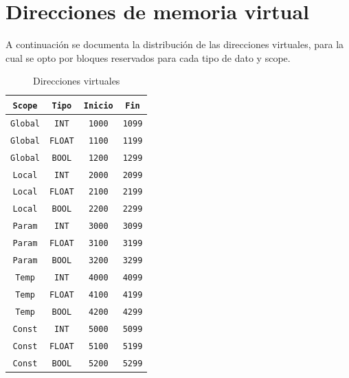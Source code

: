 \documentclass[12pt, letterpaper]{article}
\theoremstyle{definition}
\begin{document}
\section{Direcciones de memoria virtual}
A continuación se documenta la distribución de las direcciones virtuales, para la cual se opto por bloques reservados para cada tipo de dato y scope.
\begin{table}[H]
\centering
\caption{Direcciones virtuales}
\label{tab:cubo}
\begin{tabular}{|c|c|c|c|}
    \hline
    \texttt{Scope} & \texttt{Tipo} & \texttt{Inicio} & \texttt{Fin} \\
    \hline
    \texttt{Global}   & \texttt{INT}   & \texttt{1000} & \texttt{1099}   \\ \hline
    \texttt{Global}   & \texttt{FLOAT} & \texttt{1100} & \texttt{1199}   \\ \hline
    \texttt{Global}   & \texttt{BOOL} & \texttt{1200} & \texttt{1299}   \\ \hline
    \texttt{Local}   & \texttt{INT}   & \texttt{2000} & \texttt{2099}   \\ \hline
    \texttt{Local}   & \texttt{FLOAT} & \texttt{2100} & \texttt{2199}   \\ \hline
    \texttt{Local}   & \texttt{BOOL} & \texttt{2200} & \texttt{2299}   \\ \hline
    \texttt{Param}   & \texttt{INT}   & \texttt{3000} & \texttt{3099}   \\ \hline
    \texttt{Param}   & \texttt{FLOAT} & \texttt{3100} & \texttt{3199}   \\ \hline
    \texttt{Param}   & \texttt{BOOL} & \texttt{3200} & \texttt{3299}   \\ \hline
    \texttt{Temp}   & \texttt{INT}   & \texttt{4000} & \texttt{4099}   \\ \hline
    \texttt{Temp}   & \texttt{FLOAT} & \texttt{4100} & \texttt{4199}   \\ \hline
    \texttt{Temp}   & \texttt{BOOL} & \texttt{4200} & \texttt{4299}   \\ \hline
    \texttt{Const} & \texttt{INT}   & \texttt{5000} & \texttt{5099}   \\ \hline
    \texttt{Const} & \texttt{FLOAT} & \texttt{5100} & \texttt{5199}   \\ \hline
    \texttt{Const} & \texttt{BOOL} & \texttt{5200} & \texttt{5299}   \\ \hline
\end{tabular}
\end{table}
\end{document}
